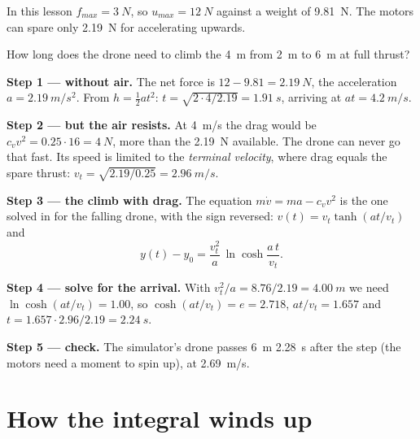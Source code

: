 In this lesson $f_{max} = \SI{3}{N}$, so $u_{max} = \SI{12}{N}$ against a weight of \SI{9.81}{N}. The motors can spare only \SI{2.19}{N} for accelerating upwards.

\begin{example}
\label{ex:windup-climb}
How long does the drone need to climb the \SI{4}{m} from \SI{2}{m} to \SI{6}{m} at full thrust?

\textbf{Step 1 — without air.} The net force is $12 - 9.81 = \SI{2.19}{N}$, the acceleration $a = \SI{2.19}{m/s^2}$. From $h = \tfrac12 a t^2$: $t = \sqrt{2 \cdot 4/2.19} = \SI{1.91}{s}$, arriving at $a t = \SI{4.2}{m/s}$.

\textbf{Step 2 — but the air resists.} At \SI{4}{m/s} the drag would be $c_v v^2 = 0.25 \cdot 16 = \SI{4}{N}$, more than the \SI{2.19}{N} available. The drone can never go that fast. Its speed is limited to the \emph{terminal velocity}, where drag equals the spare thrust: $v_t = \sqrt{2.19/0.25} = \SI{2.96}{m/s}$.

\textbf{Step 3 — the climb with drag.} The equation $m\dot v = ma - c_v v^2$ is the one solved in  for the falling drone, with the sign reversed: $v(t) = v_t\tanh(a t/v_t)$ and
\begin{equation}\label{eq:windup-climb}
  y(t) - y_0 = \frac{v_t^2}{a}\,\ln\cosh\frac{a\,t}{v_t} .
\end{equation}

\textbf{Step 4 — solve for the arrival.} With $v_t^2/a = 8.76/2.19 = \SI{4.00}{m}$ we need $\ln\cosh(at/v_t) = 1.00$, so $\cosh(at/v_t) = e = 2.718$, $at/v_t = 1.657$ and $t = 1.657 \cdot 2.96/2.19 = \SI{2.24}{s}$.

\textbf{Step 5 — check.} The simulator's drone passes \SI{6}{m} \SI{2.28}{s} after the step (the motors need a moment to spin up), at \SI{2.69}{m/s}.
\end{example}

\section{How the integral winds up}

